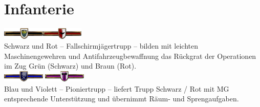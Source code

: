 \section{Infanterie}
\includegraphics[width=20mm]{./img/truppengattungen/infanterie/TrSchwarz}\quad\includegraphics[width=20mm]{./img/truppengattungen/infanterie/TrRot}\\
Schwarz und Rot -- Fallschirmjägertrupp -- bilden mit leichten Maschinengewehren und Antifahrzeugbewaffnung das Rückgrat der Operationen im Zug Grün (Schwarz) und Braun (Rot).\\

\includegraphics[width=20mm]{./img/truppengattungen/infanterie/TrBlau} \quad \includegraphics[width=20mm]{./img/truppengattungen/infanterie/TrViolett}\\
Blau und Violett -- Pioniertrupp -- liefert Trupp Schwarz / Rot mit MG entsprechende Unterstützung und übernimmt Räum- und Sprengaufgaben.